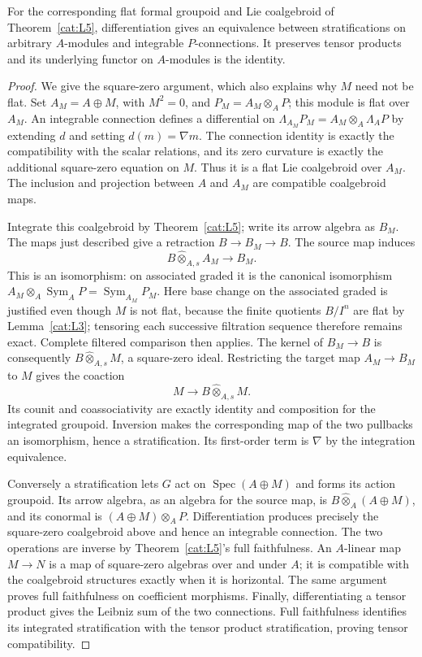 \begin{theorem}\label{cat:L6}
For the corresponding flat formal groupoid and Lie coalgebroid of
Theorem~\ref{cat:L5}, differentiation gives an equivalence between
stratifications on arbitrary $A$-modules and integrable $P$-connections.
It preserves tensor products and its underlying functor on $A$-modules
is the identity.
\end{theorem}
\begin{proof}
We give the square-zero argument, which also explains why $M$ need
not be flat.  Set $A_M=A\oplus M$, with $M^2=0$, and
$P_M=A_M\otimes_A P$; this module is flat over $A_M$.
An integrable connection defines a differential on
$\Lambda_{A_M}P_M=A_M\otimes_A\Lambda_AP$ by extending $d$ and
setting $d(m)=\nabla m$.  The connection identity is exactly the
compatibility with the scalar relations, and its zero curvature is
exactly the additional square-zero equation on $M$.
Thus it is a flat Lie coalgebroid over $A_M$.  The inclusion and
projection between $A$ and $A_M$ are compatible coalgebroid maps.

Integrate this coalgebroid by Theorem~\ref{cat:L5}; write its arrow
algebra as $B_M$.  The maps just described give a retraction
$B\to B_M\to B$.  The source map induces
\[
 B\widehat\otimes_{A,s}A_M\longrightarrow B_M.
\]
This is an isomorphism: on associated graded it is the canonical
isomorphism
$A_M\otimes_A\operatorname{Sym}_AP
 =\operatorname{Sym}_{A_M}P_M$.
Here base change on the associated graded is justified even though
$M$ is not flat, because the finite quotients $B/I^n$ are flat by
Lemma~\ref{cat:L3}; tensoring each successive filtration sequence
therefore remains exact.  Complete filtered comparison then applies.
The kernel of $B_M\to B$ is consequently
$B\widehat\otimes_{A,s}M$, a square-zero ideal.
Restricting the target map $A_M\to B_M$ to $M$ gives the coaction
\[
 M\longrightarrow B\widehat\otimes_{A,s}M.
\]
Its counit and coassociativity are exactly identity and composition
for the integrated groupoid.  Inversion makes the corresponding map
of the two pullbacks an isomorphism, hence a stratification.
Its first-order term is $\nabla$ by the integration equivalence.

Conversely a stratification lets $G$ act on
$\operatorname{Spec}(A\oplus M)$ and forms its action groupoid.
Its arrow algebra, as an algebra for the source map, is
$B\widehat\otimes_A(A\oplus M)$, and its conormal is
$(A\oplus M)\otimes_AP$.  Differentiation produces precisely the
square-zero coalgebroid above and hence an integrable connection.
The two operations are inverse by Theorem~\ref{cat:L5}'s full
faithfulness.  An $A$-linear map $M\to N$ is a map of square-zero
algebras over and under $A$; it is compatible with the coalgebroid
structures exactly when it is horizontal.  The same argument proves
full faithfulness on coefficient morphisms.  Finally, differentiating
a tensor product gives the Leibniz sum of the two connections.  Full
faithfulness identifies its integrated stratification with the tensor
product stratification, proving tensor compatibility.
\end{proof}

